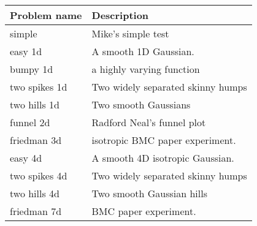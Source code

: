 \begin{table}[h!]
\label{tbl:problem_descriptions}
\begin{center}
\begin{tabular}{ll}
 Problem name & Description \ 
 \\ \midrule 
simple & Mike's simple test \\ 
easy 1d & A smooth 1D Gaussian. \\ 
bumpy 1d & a highly varying function \\ 
two spikes 1d & Two widely separated skinny humps \\ 
two hills 1d & Two smooth Gaussians \\ 
funnel 2d & Radford Neal's funnel plot \\ 
friedman 3d & isotropic BMC paper experiment. \\ 
easy 4d & A smooth 4D isotropic Gaussian. \\ 
two spikes 4d & Two widely separated skinny humps \\ 
two hills 4d & Two smooth Gaussian hills \\ 
friedman 7d & BMC paper experiment. \\ 
\end{tabular}
\end{center}
\end{table}
